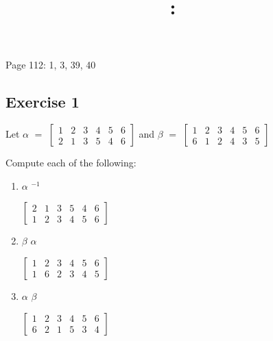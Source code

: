 \documentclass{article}
\title{
    \vspace{2in}
    \textmd{\textbf{\hmwkClass:\ \hmwkTitle}}\\
    \normalsize\vspace{0.1in}\small\vspace{0.1in}\large{\textit{\hmwkClassInstructor}}
    \vspace{3in}
}
\author{\hmwkAuthorName}
\date{}
\newcommand{\mt}[1]{\ensuremath{#1}}
\newcommand\ssc[2][\DefaultOpt]{%
  \def\DefaultOpt{#2}%
  \subsection[#1]{#2}%
}
\newcommand{\balist}{\begin{enumerate}[label=\alph*.]}
\newcommand{\elist}{\end{enumerate}}
\newcommand{\afa}{\mt{\alpha} }
\newcommand{\bta}{\mt{\beta} }
\newcommand{\eql}{\mt{=} }
\newcommand{\uf}[2]{#1\mt{^{#2}}}
\begin{document}
	
Page 112: 1, 3, 39, 40

\ssc{Exercise 1}{

Let \afa \eql \mt{\left[
  \begin{array}{cccccc}
  1 & 2 & 3 & 4 & 5 & 6 \\
  2 & 1 & 3 & 5 & 4 & 6
  \end{array}
\right]}
and
\bta \eql \mt{\left[
  \begin{array}{cccccc}
  1 & 2 & 3 & 4 & 5 & 6 \\
  6 & 1 & 2 & 4 & 3 & 5
  \end{array}
\right]}

Compute each of the following:

\balist 
\item \uf{\afa}{-1}

\mt{\left[
  \begin{array}{cccccc}
  2 & 1 & 3 & 5 & 4 & 6 \\
  1 & 2 & 3 & 4 & 5 & 6
  \end{array}
\right]}

\item \bta\afa

\mt{\left[
  \begin{array}{cccccc}
  1 & 2 & 3 & 4 & 5 & 6 \\
  1 & 6 & 2 & 3 & 4 & 5
  \end{array}
\right]}

\item \afa\bta

\mt{\left[
  \begin{array}{cccccc}
  1 & 2 & 3 & 4 & 5 & 6 \\
  6 & 2 & 1 & 5 & 3 & 4
  \end{array}
\right]}

\elist

}
\end{document}
